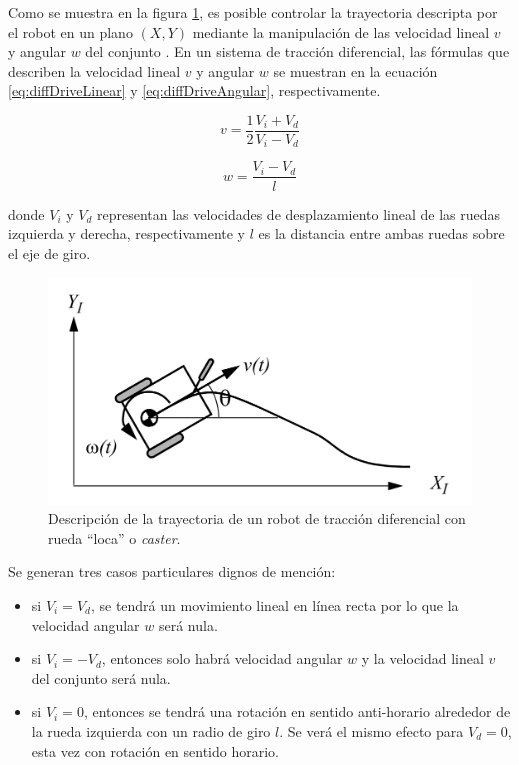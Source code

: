Como se muestra en la figura \ref{fig:diffDrive}, es posible controlar la trayectoria descripta por el robot en un plano $(X,Y)$ mediante la manipulación de las velocidad lineal $v$ y angular $w$ del conjunto \citep{BOOK:3}. En un sistema de tracción diferencial, las fórmulas que describen la velocidad lineal $v$ y angular $w$ se muestran en la ecuación \ref{eq:diffDriveLinear} y \ref{eq:diffDriveAngular}, respectivamente.

\begin{equation}
    \label{eq:diffDriveLinear}
    v = \frac{1}{2} \frac{V_i + V_d}{V_i - V_d}
\end{equation}

\begin{equation}
    \label{eq:diffDriveAngular}
    w = \frac{V_i - V_d}{l}
\end{equation}

donde $V_i$ y $V_d$ representan las velocidades de desplazamiento lineal de las ruedas izquierda y derecha, respectivamente y $l$ es la distancia entre ambas ruedas sobre el eje de giro.

\begin{figure}[ht]
    \centering
    \includegraphics[scale=0.8]{./Figures/diff_drive.png}
    \caption{Descripción de la trayectoria de un robot de tracción diferencial con rueda ``loca'' o \textit{caster}.}
    \label{fig:diffDrive}
\end{figure}

Se generan tres casos particulares dignos de mención:
\begin{itemize}
    \item si $V_i = V_d$, se tendrá un movimiento lineal en línea recta por lo que la velocidad angular $w$ será nula.
    \item si $V_i = - V_d$, entonces solo habrá velocidad angular $w$ y la velocidad lineal $v$ del conjunto será nula.
    \item si $V_i = 0$, entonces se tendrá una rotación en sentido anti-horario alrededor de la rueda izquierda con un radio de giro $l$. Se verá el mismo efecto para $V_d = 0$, esta vez con rotación en sentido horario.
\end{itemize}

